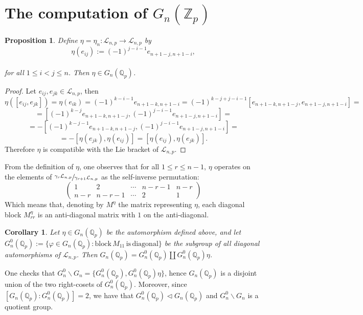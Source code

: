 \documentclass{article}
\newtheorem{proposition2}[theorem2]{Proposition}
\newtheorem{corollary2}[theorem2]{Corollary}
\begin{document}
\section{The computation of $G_{n}(\mathbb{Z}_{p})$}
\begin{proposition2}
Define $\eta=\eta_{n}:\mathcal{L}_{n,p}\rightarrow\mathcal{L}_{n,p}$ by \[\eta(e_{ij}):=(-1)^{j-i-1}e_{n+1-j,n+1-i},\]\\ for all $1\leq{i}<{j}\leq{n}$. Then
$\eta\in{G_{n}(\mathbb{Q}_{p})}$.
\end{proposition2}
\begin{proof}
Let $e_{ij},e_{jk}\in\mathcal{L}_{n,p}$, then $\eta([e_{ij},e_{jk}])=\eta(e_{ik})=(-1)^{k-i-1}e_{n+1-k,n+1-i}=(-1)^{k-j+j-i-1}[e_{n+1-k,n+1-j},e_{n+1-j,n+1-i}]=$\[=[(-1)^{k-j}e_{n+1-k,n+1-j},(-1)^{j-i-1}e_{n+1-j,n+1-i}]=\]\[=-[(-1)^{k-j-1}e_{n+1-k,n+1-j},(-1)^{j-i-1}e_{n+1-j,n+1-i}]=\]\[=-[\eta(e_{jk}),\eta(e_{ij})]=[\eta(e_{ij}),\eta(e_{jk})].\]
Therefore $\eta$ is compatible with the Lie bracket of $\mathcal{L}_{n,p}$.
\end{proof}
From the definition of $\eta$, one observes that for all $1\leq{r}\leq{n-1}$, $\eta$ operates on the elements of $\sfrac{\gamma_{r}\mathcal{L}_{n,p}}{\gamma_{r+1}\mathcal{L}_{n,p}}$ as the self-inverse permutation: \[  \begin{pmatrix}
    1 & 2 & \cdots & n-r-1 & n-r \\
    n-r & n-r-1 & \cdots & 2 & 1
  \end{pmatrix}\]
Which means that, denoting by $M^{\eta}$ the matrix representing $\eta$, each diagonal block $M^{\eta}_{rr}$ is an anti-diagonal matrix with $1$ on the anti-diagonal.
\begin{corollary2}
Let $\eta\in{G_{n}(\mathbb{Q}_{p})}$ be the automorphism defined above, and let $G_{n}^{0}(\mathbb{Q}_{p}):=\{\varphi\in{G_{n}(\mathbb{Q}_{p})} : \mathrm{block}\,M_{11}\,\mathrm{is}\,\mathrm{diagonal}\}$ be the subgroup of all diagonal automorphisms of $\mathcal{L}_{n,p}$. Then $G_{n}(\mathbb{Q}_{p})=G_{n}^{0}(\mathbb{Q}_{p})\coprod{G_{n}^{0}(\mathbb{Q}_{p})\eta}$.
\end{corollary2}
One checks that ${G_{n}^{0}}\backslash{G_{n}}=\{G_{n}^{0}(\mathbb{Q}_{p}),G_{n}^{0}(\mathbb{Q}_{p})\eta\}$, hence $G_{n}(\mathbb{Q}_{p})$ is a disjoint union of the two right-cosets of $G_{n}^{0}(\mathbb{Q}_{p})$. Moreover, since $[G_{n}(\mathbb{Q}_{p}):G_{n}^{0}(\mathbb{Q}_{p})]=2$, we have that $G_{n}^{0}(\mathbb{Q}_{p})\triangleleft{G_{n}(\mathbb{Q}_{p})}$ and ${G_{n}^{0}}\backslash{G_{n}}$ is a quotient group.
\end{document}

